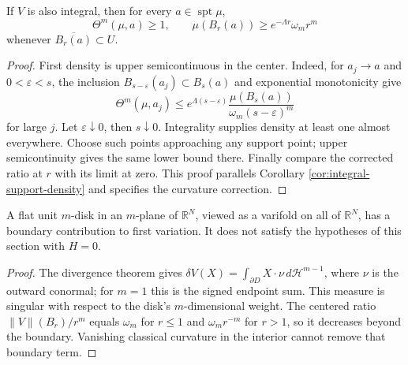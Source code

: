 \begin{corollary}\label{cor:bounded-curvature-support-density}
If $V$ is also integral, then for every $a\in\operatorname{spt}\mu$,
\[
 \Theta^m(\mu,a)\geq1,\qquad
 \mu(B_r(a))\geq e^{-\Lambda r}\omega_m r^m
\]
whenever $\overline{B_r(a)}\subset U$.
\end{corollary}
\begin{proof}
First density is upper semicontinuous in the center. Indeed, for $a_j\to a$ and $0<\varepsilon<s$, the inclusion $B_{s-\varepsilon}(a_j)\subset B_s(a)$ and exponential monotonicity give
\[
 \Theta^m(\mu,a_j)\leq
 e^{\Lambda(s-\varepsilon)}\frac{\mu(B_s(a))}{\omega_m(s-\varepsilon)^m}
\]
for large $j$. Let $\varepsilon\downarrow0$, then $s\downarrow0$. Integrality supplies density at least one almost everywhere. Choose such points approaching any support point; upper semicontinuity gives the same lower bound there. Finally compare the corrected ratio at $r$ with its limit at zero. This proof parallels Corollary \ref{cor:integral-support-density} and specifies the curvature correction.
\end{proof}

\begin{example}\label{ex:disk-singular-first-variation}
A flat unit $m$-disk in an $m$-plane of $\mathbb R^N$, viewed as a varifold on all of $\mathbb R^N$, has a boundary contribution to first variation. It does not satisfy the hypotheses of this section with $H=0$.
\end{example}
\begin{proof}
The divergence theorem gives $\delta V(X)=\int_{\partial D}X\cdot\nu\,d\mathcal H^{m-1}$, where $\nu$ is the outward conormal; for $m=1$ this is the signed endpoint sum. This measure is singular with respect to the disk's $m$-dimensional weight. The centered ratio $\|V\|(B_r)/r^m$ equals $\omega_m$ for $r\leq1$ and $\omega_m r^{-m}$ for $r>1$, so it decreases beyond the boundary. Vanishing classical curvature in the interior cannot remove that boundary term.
\end{proof}
